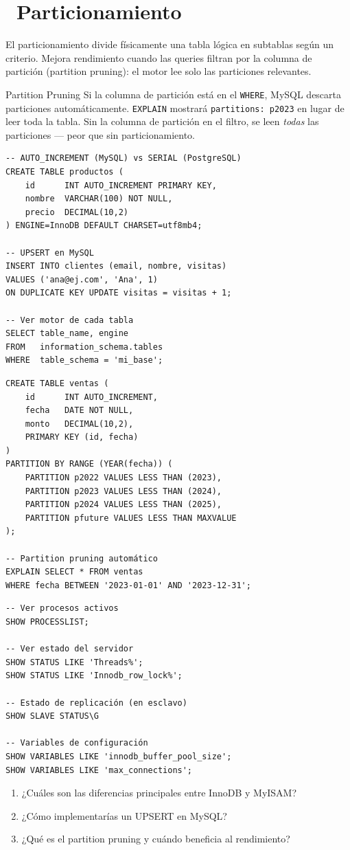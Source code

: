 \section[Particionamiento]{~Particionamiento}

El particionamiento divide físicamente una tabla lógica en subtablas según un criterio.
Mejora rendimiento cuando las queries filtran por la columna de partición (partition pruning): el motor lee solo las particiones relevantes.

\begin{tipbox}{Partition Pruning}
Si la columna de partición está en el \texttt{WHERE}, MySQL descarta particiones automáticamente.
\texttt{EXPLAIN} mostrará \texttt{partitions: p2023} en lugar de leer toda la tabla.
Sin la columna de partición en el filtro, se leen \emph{todas} las particiones --- peor que sin particionamiento.
\end{tipbox}

\begin{lstlisting}[caption={Sintaxis MySQL --- diferencias con PostgreSQL}]
-- AUTO_INCREMENT (MySQL) vs SERIAL (PostgreSQL)
CREATE TABLE productos (
    id      INT AUTO_INCREMENT PRIMARY KEY,
    nombre  VARCHAR(100) NOT NULL,
    precio  DECIMAL(10,2)
) ENGINE=InnoDB DEFAULT CHARSET=utf8mb4;

-- UPSERT en MySQL
INSERT INTO clientes (email, nombre, visitas)
VALUES ('ana@ej.com', 'Ana', 1)
ON DUPLICATE KEY UPDATE visitas = visitas + 1;

-- Ver motor de cada tabla
SELECT table_name, engine
FROM   information_schema.tables
WHERE  table_schema = 'mi_base';
\end{lstlisting}

\begin{lstlisting}[caption={Particionamiento por RANGE en MySQL}]
CREATE TABLE ventas (
    id      INT AUTO_INCREMENT,
    fecha   DATE NOT NULL,
    monto   DECIMAL(10,2),
    PRIMARY KEY (id, fecha)
)
PARTITION BY RANGE (YEAR(fecha)) (
    PARTITION p2022 VALUES LESS THAN (2023),
    PARTITION p2023 VALUES LESS THAN (2024),
    PARTITION p2024 VALUES LESS THAN (2025),
    PARTITION pfuture VALUES LESS THAN MAXVALUE
);

-- Partition pruning automático
EXPLAIN SELECT * FROM ventas
WHERE fecha BETWEEN '2023-01-01' AND '2023-12-31';
\end{lstlisting}

\begin{lstlisting}[caption={Monitoreo y replicación básica}]
-- Ver procesos activos
SHOW PROCESSLIST;

-- Ver estado del servidor
SHOW STATUS LIKE 'Threads%';
SHOW STATUS LIKE 'Innodb_row_lock%';

-- Estado de replicación (en esclavo)
SHOW SLAVE STATUS\G

-- Variables de configuración
SHOW VARIABLES LIKE 'innodb_buffer_pool_size';
SHOW VARIABLES LIKE 'max_connections';
\end{lstlisting}

\begin{entrevistabox}
\begin{enumerate}
  \item ¿Cuáles son las diferencias principales entre InnoDB y MyISAM?
  \item ¿Cómo implementarías un UPSERT en MySQL?
  \item ¿Qué es el partition pruning y cuándo beneficia al rendimiento?
\end{enumerate}
\end{entrevistabox}
